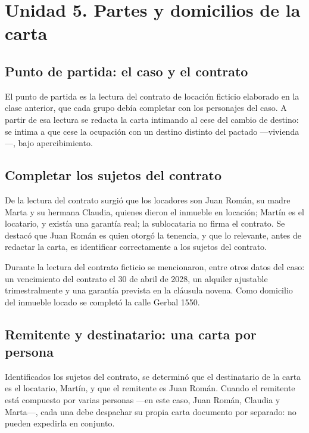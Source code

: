 \documentclass[12pt,oneside]{book}
\begin{document}
\section*{Unidad 5. Partes y domicilios de la carta}

\subsection*{Punto de partida: el caso y el contrato}

El punto de partida es la lectura del contrato de locación ficticio elaborado en la clase anterior, que cada grupo debía completar con los personajes del caso. A partir de esa lectura se redacta la carta intimando al cese del cambio de destino: se intima a que cese la ocupación con un destino distinto del pactado —vivienda—, bajo apercibimiento.

\subsection*{Completar los sujetos del contrato}

De la lectura del contrato surgió que los locadores son Juan Román, su madre Marta y su hermana Claudia, quienes dieron el inmueble en locación; Martín es el locatario, y existía una garantía real; la sublocataria no firma el contrato. Se destacó que Juan Román es quien otorgó la tenencia, y que lo relevante, antes de redactar la carta, es identificar correctamente a los sujetos del contrato.

\begin{note}
Durante la lectura del contrato ficticio se mencionaron, entre otros datos del caso: un vencimiento del contrato el 30 de abril de 2028, un alquiler ajustable trimestralmente y una garantía prevista en la cláusula novena. Como domicilio del inmueble locado se completó la calle Gerbal 1550.
\end{note}

\subsection*{Remitente y destinatario: una carta por persona}

Identificados los sujetos del contrato, se determinó que el destinatario de la carta es el locatario, Martín, y que el remitente es Juan Román. Cuando el remitente está compuesto por varias personas —en este caso, Juan Román, Claudia y Marta—, cada una debe despachar su propia carta documento por separado: no pueden expedirla en conjunto.
\end{document}
